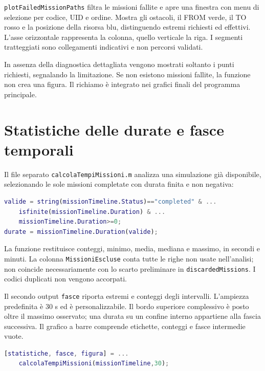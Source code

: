 \texttt{plotFailedMissionPaths} filtra le missioni fallite e apre una
finestra con menu di selezione per codice, UID e ordine. Mostra gli ostacoli,
il FROM verde, il TO rosso e la posizione della risorsa blu, distinguendo
estremi richiesti ed effettivi. L'asse orizzontale rappresenta la colonna,
quello verticale la riga. I segmenti tratteggiati sono collegamenti
indicativi e non percorsi validati.

In assenza della diagnostica dettagliata vengono mostrati soltanto i punti
richiesti, segnalando la limitazione. Se non esistono missioni fallite,
la funzione non crea una figura. Il richiamo è integrato nei grafici finali
del programma principale.

\section{Statistiche delle durate e fasce temporali}
\label{sec:impl-statistiche}

Il file separato \texttt{calcolaTempiMissioni.m} analizza una simulazione
già disponibile, selezionando le sole missioni completate con durata
finita e non negativa:

\begin{lstlisting}[language=Matlab,caption={Filtro delle durate utilizzate nell'analisi.},label={lst:impl-filtro}]
valide = string(missionTimeline.Status)=="completed" & ...
    isfinite(missionTimeline.Duration) & ...
    missionTimeline.Duration>=0;
durate = missionTimeline.Duration(valide);
\end{lstlisting}

La funzione restituisce conteggi, minimo, media, mediana e massimo, in
secondi e minuti. La colonna \texttt{MissioniEscluse} conta tutte le righe
non usate nell'analisi; non coincide necessariamente con lo scarto preliminare
in \texttt{discardedMissions}. I codici duplicati non vengono accorpati.

Il secondo output \texttt{fasce} riporta estremi e conteggi degli intervalli.
L'ampiezza predefinita è 30 s ed è personalizzabile. Il bordo superiore
complessivo è posto oltre il massimo osservato; una durata su un confine
interno appartiene alla fascia successiva. Il grafico a barre comprende
etichette, conteggi e fasce intermedie vuote.

\begin{lstlisting}[language=Matlab,caption={Analisi con fasce di trenta secondi.},label={lst:impl-statistiche}]
[statistiche, fasce, figura] = ...
    calcolaTempiMissioni(missionTimeline,30);
\end{lstlisting}

